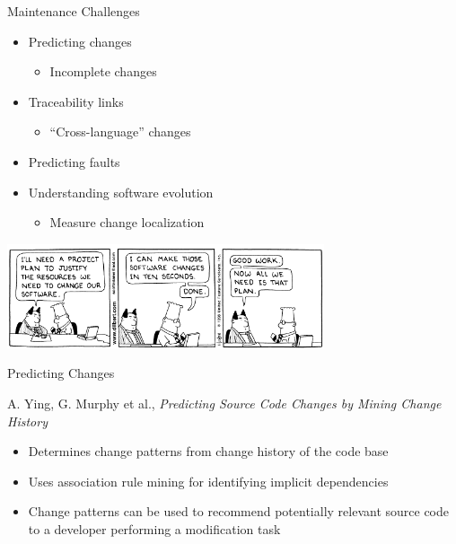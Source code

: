 \begin{frame}{Maintenance Challenges}
  \begin{itemize}
  \item Predicting changes
    \begin{itemize}
    \item Incomplete changes
    \end{itemize}
  \item Traceability links
    \begin{itemize}
    \item ``Cross-language'' changes
    \end{itemize}
  \item Predicting faults
  \item Understanding software evolution
    \begin{itemize}
    \item Measure change localization
    \end{itemize}
  \end{itemize}


  \begin{center}
    \includegraphics[width=0.7\textwidth]{figures/dilbert-software-changes}
  \end{center}
\end{frame}

\note{
}

\begin{frame}{Predicting Changes}
  \begin{thebibliography}
    \beamertemplatearticlebibitems
    A. Ying, G. Murphy et al., {\em Predicting Source Code Changes by
      Mining Change History}
  \end{thebibliography}


  \begin{itemize}
  \item Determines change patterns from change history of the code
    base
  \item Uses association rule mining for identifying implicit
    dependencies
  \item Change patterns can be used to recommend potentially relevant
    source code to a developer performing a modification task
  \end{itemize}
\end{frame}

